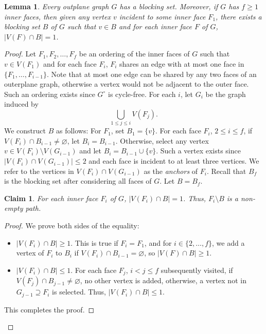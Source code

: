 \documentclass{patmorin}
\let\emptyset\varnothing
\newcommand{\wdual}[1]{#1^{\circ}}
\newtheorem{lemma}[theorem]{Lemma}
\newtheorem{claim}{Claim}[theorem]
\begin{document}
\begin{lemma}
 Every outplane graph $G$ has a blocking set. Moreover, if $G$ has
 $f\ge 1$ inner faces, 
 then given any vertex $v$ incident to some inner face $F_1$, there exists a blocking set $B$ of $G$ such that $v \in B$ and for each inner face $F$ of $G$, $|V(F) \cap B|=1$.
 \label{lem:blocking_out}
\end{lemma}
\begin{proof}
 Let $F_1,F_2,\ldots,F_{f}$ be an ordering of the inner faces of $G$ such that $v \in V(F_1)$ and for each face $F_i$, $F_i$ shares an edge with at most one face in $\{F_1,\ldots,F_{i-1}\}$. Note that at most one edge can be shared by any two faces of an outerplane graph, otherwise a vertex would not be adjacent to the outer face. 
 Such an ordering exists since $\wdual{G}$ is cycle-free. For each $i$, let $G_i$ be the graph induced by
 \begin{equation}
  \bigcup_{1 \leq j \leq i}V(F_j).
 \end{equation}
 We construct $B$ as follows: For $F_1$, set $B_1=\{v\}$. For each face $F_i$, $2 \leq i \leq f$, if $V(F_i) \cap B_{i-1} \not= \emptyset$, let $B_i = B_{i-1}$. Otherwise, select any vertex $v \in V(F_i) \setminus V(G_{i-1})$ and let $B_i = B_{i-1} \cup \{v\}$. Such a vertex exists since $|V(F_i) \cap V(G_{i-1})|\leq2$ and each face is incident to at least three vertices. We refer to the vertices in $V(F_i) \cap V(G_{i-1})$ as the \emph{anchors} of $F_i$. Recall that $B_f$ is the blocking set after considering all faces of $G$. Let $B=B_{f}$.
 
 \begin{claim}
  For each inner face $F_i$ of $G$, $|V(F_i) \cap B|=1$. Thus, $F_i \setminus B$ is a non-empty path.
  \label{claim:blocking_out_1}
 \end{claim}
 
 \begin{proof}
  We prove both sides of the equality:
  \begin{itemize}
   \item $|V(F_i) \cap B|\geq1$. This is true if $F_i=F_1$, and for $i \in \{2,\ldots,f\}$, we add a vertex of $F_i$ to $B_i$ if $V(F_i) \cap B_{i-1}=\emptyset$, so $|V(F) \cap B|\geq1$.
   \item $|V(F_i) \cap B|\leq1$. For each face $F_j$, $i < j \leq f$ subsequently visited, if $V(F_j) \cap B_{j-1} \not= \emptyset$, no other vertex is added, otherwise, a vertex not in $G_{j-1}\supseteq F_i$ is selected. Thus, $|V(F_i) \cap B|\leq1$. 
  \end{itemize}
  This completes the proof.
 \end{proof}
 

\end{proof}
\end{document}
